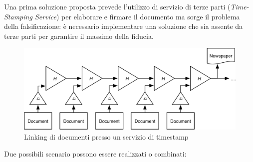 Una prima soluzione proposta prevede l'utilizzo di servizio di terze parti (\textit{Time-Stamping Service}) per elaborare e firmare il documento ma sorge il problema della falsificazione: è necessario implementare una soluzione che sia assente da terze parti per garantire il massimo della fiducia.
\begin{figure}
    \centering
    \includegraphics[width=\textwidth]{images/haberstornetta.png}
    \caption{Linking di documenti presso un servizio di timestamp}
    \label{fig:haberstornetta}
\end{figure}
Due possibili scenario possono essere realizzati o combinati:
